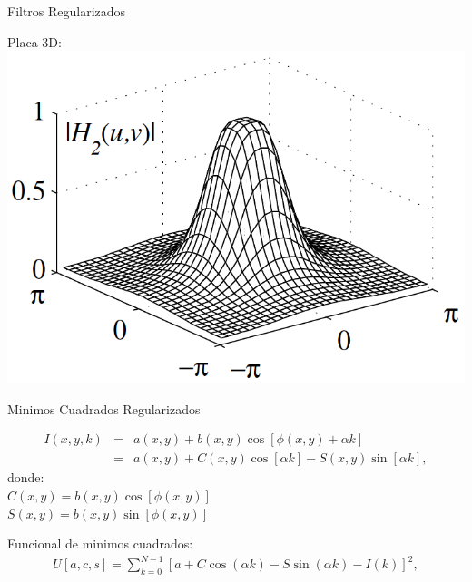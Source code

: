 \documentclass[]{beamer}
\begin{document}
\begin{frame}{Filtros Regularizados}
\begin{center}

Placa 3D:\\
\includegraphics[scale=0.6]{Images/FrecuenciaPlaca3D.png}

\end{center}
\end{frame}
\begin{frame}{Minimos Cuadrados Regularizados}
\begin{center}

\begin{eqnarray}
  I(x,y,k) &=& a(x,y) + b(x,y)\cos[\phi(x,y) +\alpha k] \nonumber \\
  &=& a(x,y) + C(x,y)\cos[\alpha k] - S(x,y)\sin[\alpha k],
\end{eqnarray}
donde:\\
$C(x,y)=b(x,y)\cos[\phi(x,y)]$ \\ 
$S(x,y)=b(x,y)\sin[\phi(x,y)]$

Funcional de minimos cuadrados:
\begin{align}
  U[a,c,s]= \sum_{k=0}^{N-1}\left[a + C \cos(\alpha k)\right.
  -\left. S \sin(\alpha k)-I(k) \right]^2,
\end{align}


\end{center}
\end{frame}
\end{document}
